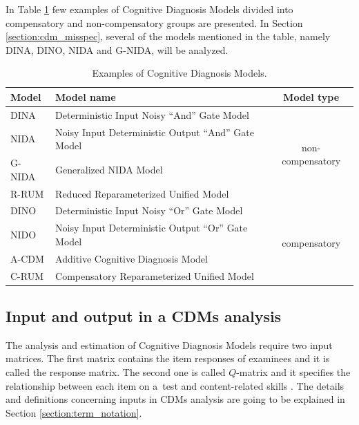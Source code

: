\documentclass[english]{pwr_wmat_praca_dyplomowa}
\theoremstyle{plain}
\theoremstyle{definition}
\numberwithin{theorem}{chapter}
\begin{document}
In Table \ref{tab:cdms} few examples of Cognitive Diagnosis Models divided into compensatory and non-compensatory groups are presented. In Section \ref{section:cdm_misspec}, several of the models mentioned in the table, namely DINA, DINO, NIDA and G-NIDA, will be analyzed. 

\begin{table}[H]
	\centering
	\small
	\begin{tabular}{l l c} 
		\hline  
		{\rule{0pt}{3ex}}Model & Model name & Model type \\ [0.5ex]
		\hline 
		{\rule{0pt}{3ex}}DINA & Deterministic Input Noisy ``And'' Gate Model \cite{dina_model} & \multirow{4}{*}{non-compensatory} \\
		NIDA & Noisy Input Deterministic Output ``And'' Gate Model \cite{nida_maris} \qquad & \\
		G-NIDA & Generalized NIDA Model \cite{nida_maris} & \\
		R-RUM & Reduced Reparameterized Unified Model \cite{rrum} & \\
		\hline
		{\rule{0pt}{3ex}}DINO & Deterministic Input Noisy ``Or'' Gate Model \cite{dino_model} & \multirow{4}{*}{compensatory}\\
		NIDO & Noisy Input Deterministic Output ``Or'' Gate Model \cite{book_models} & \\
		A-CDM & Additive Cognitive Diagnosis Model \cite{de_la_torre_2011} & \\
		C-RUM & Compensatory Reparameterized Unified Model \cite{rrum} & \\ [0.5ex] 
		\hline
	\end{tabular}
	\caption{Examples of Cognitive Diagnosis Models.}
	\label{tab:cdms} 
\end{table}

\subsection{Input and output in a CDMs analysis}

The analysis and estimation of Cognitive Diagnosis Models require two input matrices. The first matrix contains the item responses of examinees and it is called the response matrix. The second one is called $Q$-matrix and it specifies the relationship between each item on a~test and content-related skills \cite{gdina_in_r}. The details and definitions concerning inputs in CDMs analysis are going to be explained in Section \ref{section:term_notation}. 
\end{document}
